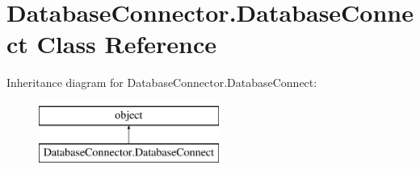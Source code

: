 \hypertarget{classDatabaseConnector_1_1DatabaseConnect}{}\section{Database\+Connector.\+Database\+Connect Class Reference}
\label{classDatabaseConnector_1_1DatabaseConnect}
Inheritance diagram for Database\+Connector.\+Database\+Connect\+:\begin{figure}[H]
\begin{center}
\leavevmode
\includegraphics[height=2.000000cm]{classDatabaseConnector_1_1DatabaseConnect}
\end{center}
\end{figure}
